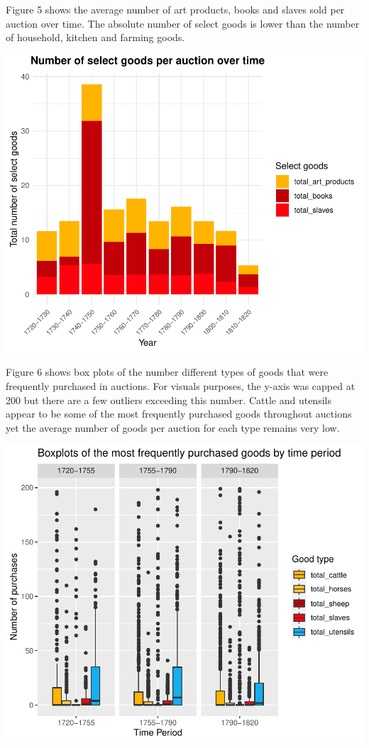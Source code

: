 \documentclass[11pt,preprint, authoryear]{elsarticle}
\numberwithin{equation}{section}
\numberwithin{figure}{section}
\numberwithin{table}{section}
\begin{document}
Figure 5 shows the average number of art products, books and slaves sold
per auction over time. The absolute number of select goods is lower than
the number of household, kitchen and farming goods.

\includegraphics{Project_write_up_files/figure-latex/Figure5-1.pdf}

Figure 6 shows box plots of the number different types of goods that
were frequently purchased in auctions. For visuals purposes, the y-axis
was capped at 200 but there are a few outliers exceeding this number.
Cattle and utensils appear to be some of the most frequently purchased
goods throughout auctions yet the average number of goods per auction
for each type remains very low.

\includegraphics{Project_write_up_files/figure-latex/Figure6-1.pdf}
\end{document}
